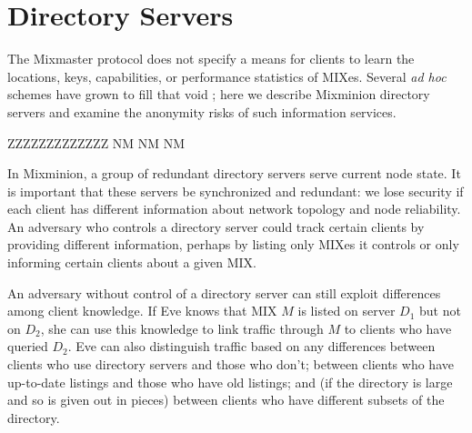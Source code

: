 \documentclass{llncs}
\begin{document}
%


\section{Directory Servers}
\label{sec:dir-servers}

The Mixmaster protocol does not specify a means for clients to learn the
locations, keys, capabilities, or performance statistics of MIXes. Several
\emph{ad hoc} schemes have grown to fill that void \cite{levien}; here
we describe Mixminion directory servers and examine the anonymity risks
of such information services.

ZZZZZZZZZZZZZ NM NM NM

In Mixminion, a group of redundant directory servers serve current
node state.  It is important that these servers be synchronized and
redundant:  we lose security if each client has different information
about network topology and node reliability. An adversary who controls
a directory server could track certain clients by providing different
information, perhaps by listing only MIXes it controls or only
informing certain clients about a given MIX.

An adversary without control of a directory server can still exploit
differences among client knowledge. If Eve knows that MIX $M$ is listed
on server $D_1$ but not on $D_2$, she can use this knowledge to link
traffic through $M$ to clients who have queried $D_2$.  Eve can also
distinguish traffic based on any differences between clients who use
directory servers and those who don't; between clients who have up-to-date
listings and those who have old listings; and (if the directory is large
and so is given out in pieces) between clients who have different subsets
of the directory.
\end{document}
